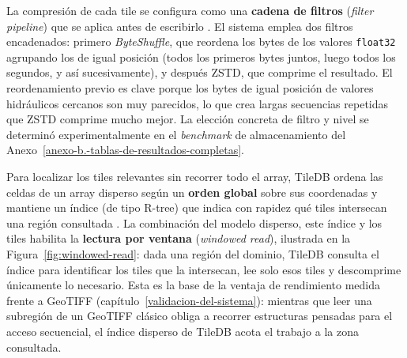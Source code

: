 La compresión de cada tile se configura como una \textbf{cadena de filtros} (\textit{filter pipeline}) que se aplica antes de escribirlo \cite{tiledb_compression}. El sistema emplea dos filtros encadenados: primero \textit{ByteShuffle}, que reordena los bytes de los valores \texttt{float32} agrupando los de igual posición (todos los primeros bytes juntos, luego todos los segundos, y así sucesivamente), y después ZSTD, que comprime el resultado. El reordenamiento previo es clave porque los bytes de igual posición de valores hidráulicos cercanos son muy parecidos, lo que crea largas secuencias repetidas que ZSTD comprime mucho mejor. La elección concreta de filtro y nivel se determinó experimentalmente en el \textit{benchmark} de almacenamiento del Anexo~\ref{anexo-b.-tablas-de-resultados-completas}.

Para localizar los tiles relevantes sin recorrer todo el array, TileDB ordena las celdas de un array disperso según un \textbf{orden global} sobre sus coordenadas y mantiene un índice (de tipo R-tree) que indica con rapidez qué tiles intersecan una región consultada \cite{tiledb_indexing}. La combinación del modelo disperso, este índice y los tiles habilita la \textbf{lectura por ventana} (\textit{windowed read}), ilustrada en la Figura~\ref{fig:windowed-read}: dada una región del dominio, TileDB consulta el índice para identificar los tiles que la intersecan, lee solo esos tiles y descomprime únicamente lo necesario. Esta es la base de la ventaja de rendimiento medida frente a GeoTIFF (capítulo~\ref{validacion-del-sistema}): mientras que leer una subregión de un GeoTIFF clásico obliga a recorrer estructuras pensadas para el acceso secuencial, el índice disperso de TileDB acota el trabajo a la zona consultada.

